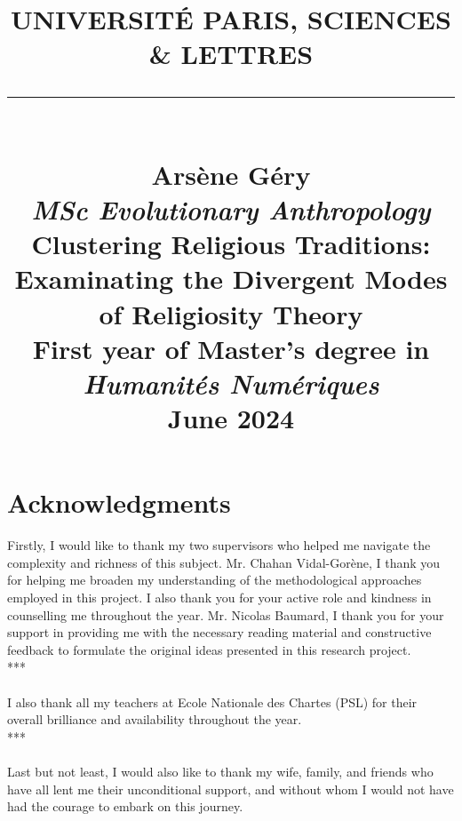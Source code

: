 \documentclass[12pt]{report}
\title{
	\vspace{-2cm}
	\Large{UNIVERSITÉ PARIS, SCIENCES \& LETTRES}
	\\
	\vspace{0.5cm}
	\rule{0.3\textwidth}{0.4pt}
	\\
	\vspace{2cm}
	\large\textbf{Arsène Géry}
	\\
	\large\textit{MSc Evolutionary Anthropology}
	\\
	\vspace{4cm}
	\large\textbf{Clustering Religious Traditions:\\ Examinating the Divergent Modes of Religiosity Theory}
	\\
	\vspace{5cm}
	\large{First year of Master's degree in}
	\\
	\Large\textit{Humanités Numériques}
	\\
	\vspace{1cm}
	\normalsize{June 2024}
}
\date{}
\begin{document}
	\onehalfspacing %
	
	\begin{titlepage}
		\centering
		\maketitle
		\thispagestyle{empty}
	\end{titlepage}
	
	\chapter*{Acknowledgments}
	Firstly, I would like to thank my two supervisors who helped me navigate the complexity and richness of this subject. Mr. Chahan Vidal-Gorène, I thank you for helping me broaden my understanding of the methodological approaches employed in this project. I also thank you for your active role and kindness in counselling me throughout the year. Mr. Nicolas Baumard, I thank you for your support in providing me with the necessary reading material and constructive feedback to formulate the original ideas presented in this research project. \\
	
	***\\
	\\
	I also thank all my teachers at Ecole Nationale des Chartes (PSL) for their overall brilliance and availability throughout the year.\\
	
	***\\
	\\
	Last but not least, I would also like to thank my wife, family, and friends who have all lent me their unconditional support, and without whom I would not have had the courage to embark on this journey.  
	
	\tableofcontents
	
\end{document}
